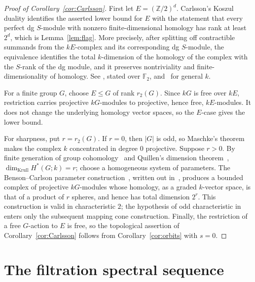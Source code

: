 \documentclass[11pt,reqno]{amsart}
\theoremstyle{plain}
\theoremstyle{definition}
\newcommand{\Ff}{\mathbb{F}}
\newcommand{\Z}{\mathbb{Z}}
\begin{document}
\begin{proof}[Proof of Corollary~\ref{cor:Carlsson}]
First let $E=(\Z/2)^d$.  Carlsson's Koszul duality identifies the asserted lower bound for $E$ with
the statement that every perfect dg $S$-module with nonzero finite-dimensional homology has rank at
least $2^d$, which is Lemma~\ref{lem:flag}.  More precisely, after splitting off contractible
summands from the $kE$-complex and its corresponding dg $S$-module, the equivalence identifies the total
$k$-dimension of the homology of the complex with the $S$-rank of the dg module, and it preserves
nontriviality and finite-dimensionality of homology.  See
\cite[Theorem~II.7 and Proposition~II.9]{Carlsson}, stated over $\Ff_2$,
and~\cite[Remark~6.2]{VW} for general $k$.

For a finite group $G$, choose $E\le G$ of rank $r_2(G)$.  Since $kG$ is free over $kE$, restriction
carries projective $kG$-modules to projective, hence free, $kE$-modules.  It does not change the
underlying homology vector spaces, so the $E$-case gives the lower bound.

For sharpness, put $r=r_2(G)$.  If $r=0$, then $|G|$ is odd, so Maschke's theorem makes the complex
$k$ concentrated in degree $0$ projective.  Suppose $r>0$.  By finite generation of group
cohomology~\cite[Corollary~6.2]{Evens} and
Quillen's dimension theorem~\cite[Part~I, Theorem~7.7]{Quillen},
$\dim_{\mathrm{Krull}}H^*(G;k)=r$; choose a homogeneous system of
parameters.  The Benson--Carlson parameter construction~\cite[\S4, especially
Theorem~4.1]{BensonCarlson}, written out in~\cite[proof of the main theorem]{CarlsonRanks}, produces a
bounded complex of projective $kG$-modules whose homology, as a graded $k$-vector space, is that of a
product of $r$ spheres, and hence has total dimension $2^r$.  This construction is valid in
characteristic $2$; the hypothesis of odd characteristic in~\cite{CarlsonRanks} enters only the
subsequent mapping cone construction.  Finally, the restriction of a free $G$-action to $E$ is
free, so the topological assertion of Corollary~\ref{cor:Carlsson} follows from
Corollary~\ref{cor:orbits} with $s=0$.
\end{proof}
\section{The filtration spectral sequence}\label{sec:hypertor}
\end{document}
